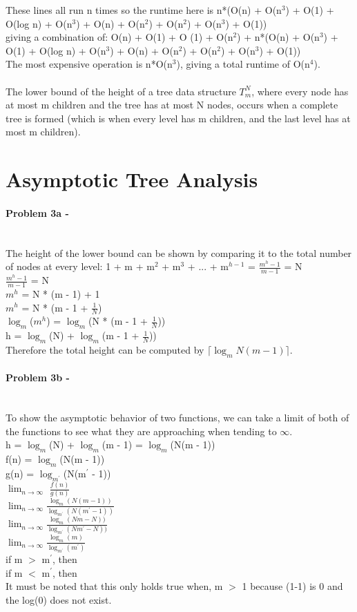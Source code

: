 \documentclass[fleqn]{article}
\begin{document}
These lines all run n times so the runtime here is n*(O(n) + O(n$^{3}$) + O(1) + O(log n) + O(n$^{3}$) + O(n) + O(n$^2$) + O(n$^2$) + O(n$^3$) + O(1))\\
giving a combination of: O(n) + O(1) + O (1) + O(n$^{2}$) + n*(O(n) + O(n$^{3}$) + O(1) + O(log n) + O(n$^{3}$) + O(n) + O(n$^2$) + O(n$^2$) + O(n$^3$) + O(1))\\
The most expensive operation is n*O(n$^3$), giving a total runtime of O(n$^4$).\\\\
 The lower bound of the height of a tree data structure $T_m^{N}$, where every node has at most m children and the tree has at most N nodes, occurs when a complete tree is formed (which is when every level has m children, and the last level has at most m children).\\
 \section{Asymptotic Tree Analysis }
 \paragraph{Problem 3a -} ~\\
The height of the lower bound can be shown by comparing it to the total number of nodes at every level: 1 + m + m$^{2}$ + m$^{3}$ + ... + m$^{h-1}$ = $\frac{m^{h} - 1}{m - 1}$ = N\\
$\frac{m^{h} - 1}{m - 1}$ = N\\
$m^{h}$ = N * (m - 1) + 1\\
$m^{h}$ = N * (m - 1 + $\frac{1}{N}$)\\
$\log_m$($m^{h}$) = $\log_m$(N * (m - 1 + $\frac{1}{N}$))\\
h  = $\log_m$(N) + $\log_m$(m - 1 + $\frac{1}{N}$))\\
Therefore the total height can be computed by $\lceil \log_m N (m-1) \rceil$.
\paragraph{Problem 3b -} ~\\
To show the asymptotic behavior of two functions, we can take a limit of both of the functions to see what they are approaching when tending to $\infty$.\\
h = $\log_m$(N) + $\log_m$(m - 1) = $\log_m$(N(m - 1))\\
f(n) =  $\log_m$(N(m - 1))\\
g(n) = $\log_{m^{'}}$(N(m$^{'}$ - 1))\\
$\lim_{n \rightarrow \infty}$ $\frac{f(n)}{g(n)}$\\
$\lim_{n \rightarrow \infty} \frac{\log_m(N(m - 1))}{\log_{m^{'}}(N(m^{'} - 1))}$\\
$\lim_{n \rightarrow \infty} \frac{\log_m(Nm - N))}{\log_{m^{'}}(Nm^{'} - N))}$\\
$\lim_{n \rightarrow \infty} \frac{\log_m(m)}{\log_{m^{'}}(m^{'})}$\\
if m $>$ m$^{'}$, then \\
if m $<$ m$^{'}$, then \\
It must be noted that this only holds true when, m $>$ 1 because (1-1) is 0 and the log(0) does not exist.
\end{document}
